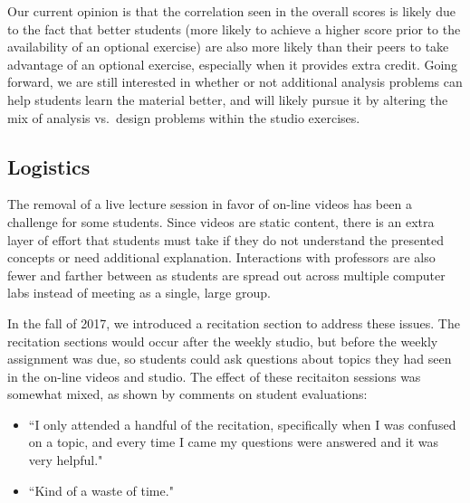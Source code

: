 Our current opinion is that the correlation seen in the overall scores
is likely due to the
fact that better students (more likely to achieve a higher score prior
to the availability of an optional exercise) are also more likely than
their peers to take advantage of an optional exercise, especially when
it provides extra credit.
Going forward, we are still interested in whether or not additional
analysis problems can help students learn the material better, and will
likely pursue it by altering the mix of analysis vs.~design problems
within the studio exercises.

\subsection{Logistics}


The removal of a live lecture session in favor of on-line videos has been
a challenge for some students. Since videos are static content, there is an
extra layer of effort that students must take if they do not understand the
presented concepts or need additional explanation. Interactions with professors
are also fewer and farther between as students are spread out across multiple
computer labs instead of meeting as a single, large group.

In the fall of 2017, we introduced a recitation section to address these issues.
The recitation sections would occur after the weekly studio, but before the weekly
assignment was due, so students could ask questions about topics they had
seen in the on-line videos and studio. The effect of these recitaiton sessions
was somewhat mixed, as shown by comments on student evaluations:
\begin{itemize}
\item ``I only attended a handful of the recitation, specifically when I was
confused on a topic, and every time I came my questions were answered and
it was very helpful."
\item ``Kind of a waste of time."
\end{itemize}

